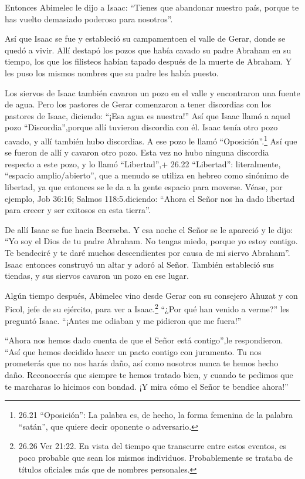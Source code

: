  Entonces Abimelec le dijo a Isaac: ``Tienes que abandonar
nuestro país, porque te has vuelto demasiado poderoso para nosotros''.

 Así que Isaac se fue y estableció su campamentoen el valle
de Gerar, donde se quedó a vivir.  Allí destapó los pozos
que había cavado su padre Abraham en su tiempo, los que los filisteos
habían tapado después de la muerte de Abraham. Y les puso los mismos
nombres que su padre les había puesto.

 Los siervos de Isaac también cavaron un pozo en el valle y
encontraron una fuente de agua.  Pero los pastores de Gerar
comenzaron a tener discordias con los pastores de Isaac, diciendo:
``¡Esa agua es nuestra!'' Así que Isaac llamó a aquel pozo
``Discordia'',porque allí tuvieron discordia con él.  Isaac
tenía otro pozo cavado, y allí también hubo discordias. A ese pozo le
llamó ``Oposición''.\footnote{26.21 ``Oposición'': La palabra es, de
  hecho, la forma femenina de la palabra ``satán'', que quiere decir
  oponente o adversario.}  Así que se fueron de allí y
cavaron otro pozo. Esta vez no hubo ninguna discordia respecto a este
pozo, y lo llamó ``Libertad'',+ 26.22 ``Libertad'': literalmente,
``espacio amplio/abierto'', que a menudo se utiliza en hebreo como
sinónimo de libertad, ya que entonces se le da a la gente espacio para
moverse. Véase, por ejemplo, Job 36:16; Salmos 118:5.diciendo: ``Ahora
el Señor nos ha dado libertad para crecer y ser exitosos en esta
tierra''.

 De allí Isaac se fue hacia Beerseba.  Y esa
noche el Señor se le apareció y le dijo: ``Yo soy el Dios de tu padre
Abraham. No tengas miedo, porque yo estoy contigo. Te bendeciré y te
daré muchos descendientes por causa de mi siervo Abraham''.
 Isaac entonces construyó un altar y adoró al Señor.
También estableció sus tiendas, y sus siervos cavaron un pozo en ese
lugar.

 Algún tiempo después, Abimelec vino desde Gerar con su
consejero Ahuzat y con Ficol, jefe de su ejército, para ver a
Isaac.\footnote{26.26 Ver 21:22. En vista del tiempo que transcurre
  entre estos eventos, es poco probable que sean los mismos individuos.
  Probablemente se trataba de títulos oficiales más que de nombres
  personales.}  ``¿Por qué han venido a verme?'' les
preguntó Isaac. ``¡Antes me odiaban y me pidieron que me fuera!''

 ``Ahora nos hemos dado cuenta de que el Señor está
contigo'',le respondieron. ``Así que hemos decidido hacer un pacto
contigo con juramento.  Tu nos prometerás que no nos harás
daño, así como nosotros nunca te hemos hecho daño. Reconocerás que
siempre te hemos tratado bien, y cuando te pedimos que te marcharas lo
hicimos con bondad. ¡Y mira cómo el Señor te bendice ahora!''


